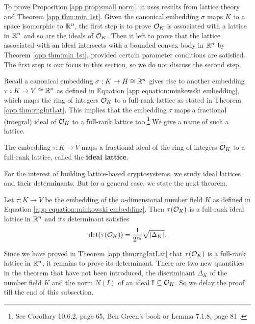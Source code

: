 \documentclass[../main.tex]{subfiles}
\begin{document}
To prove Proposition \ref{app prop:small norm}, it uses results from lattice theory and Theorem \ref{app thm:min 1st}. Given the canonical embedding $\sigma$ maps $K$ to a space isomorphic to $\mathbb{R}^n$, the first step is to prove $\mathcal{O}_K$ is associated with a lattice in $\mathbb{R}^n$ and so are the ideals of $\mathcal{O}_K$. Then it left to prove that the lattice associated with an ideal intersects with a bounded convex body in $\mathbb{R}^n$ by Theorem \ref{app thm:min 1st}, provided certain parameter conditions are satisfied. The first step is our focus in this section, so we do not discuss the second step.

Recall a canonical embedding $\sigma:K\rightarrow H \cong \mathbb{R}^n$ gives rise to another embedding $\tau:K \rightarrow V \cong \mathbb{R}^n$ as defined in Equation \ref{app equation:minkowski embedding}, which maps the ring of integers $\mathcal{O}_K$ to a full-rank lattice as stated in Theorem \ref{app thm:rngIntLat}. This implies that the embedding $\tau$ maps a fractional (integral) ideal of $\mathcal{O}_K$ to a full-rank lattice too.\footnote{See Corollary 10.6.2, page 65, Ben Green's book or Lemma 7.1.8, page 81 \citep{stein2012algebraic}.} We give a name of such a lattice. 

\begin{definition}
The embedding $\tau:K\rightarrow V$ maps a fractional ideal of the ring of integers $\mathcal{O}_K$ to a full-rank lattice, called the \textbf{ideal lattice}. 
\reversemarginpar
{}
\end{definition}

For the interest of building lattice-based cryptosystems, we study ideal lattices and their determinants. But for a general case, we state the next theorem. 

\begin{theorem}
\label{app thm:rngIntDet}
Let $\tau:K \rightarrow V$ be the embedding of the $n$-dimensional number field $K$ as defined in Equation \ref{app equation:minkowski embedding}. Then $\tau(\mathcal{O}_K)$ is a full-rank ideal lattice in $\mathbb{R}^n$ and its determinant satisfies 
\reversemarginpar
{}
\begin{equation*}
    \det(\tau(\mathcal{O}_K)) = \frac{1}{2^{r_2}}\sqrt{|\Delta_K|}.
\end{equation*}
\end{theorem}

Since we have proved in Theorem \ref{app thm:rngIntLat} that $\tau(\mathcal{O}_K)$ is a full-rank lattice in $\mathbb{R}^n$, it remains to prove its determinant. There are two new quantities in the theorem that have not been introduced, the discriminant $\Delta_K$ of the number field $K$ and the norm $N(I)$ of an ideal I $\subseteq \mathcal{O}_K$. So we delay the proof till the end of this subsection.
\end{document}
